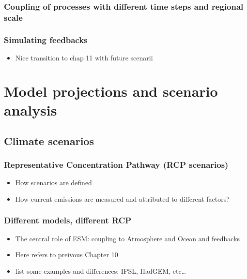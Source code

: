 \documentclass[oneside]{book}
\providecommand{\tightlist}{%
  \setlength{\itemsep}{0pt}\setlength{\parskip}{0pt}}
\begin{document}
\subsection{Coupling of processes with different time steps and regional
scale}\label{coupling-of-processes-with-different-time-steps-and-regional-scale}

\subsection{Simulating feedbacks}\label{simulating-feedbacks}

\begin{itemize}
\tightlist
\item
  Nice transition to chap 11 with future scenarii
\end{itemize}

\chapter{Model projections and scenario
analysis}\label{model-projections-and-scenario-analysis}


\section{Climate scenarios}\label{climate-scenarios}

\subsection{Representative Concentration Pathway (RCP
scenarios)}\label{representative-concentration-pathway-rcp-scenarios}

\begin{itemize}
\tightlist
\item
  How scenarios are defined
\item
  How current emissions are measured and attributed to different
  factors?
\end{itemize}

\subsection{Different models, different
RCP}\label{different-models-different-rcp}

\begin{itemize}
\tightlist
\item
  The central role of ESM: coupling to Atmosphere and Ocean and
  feedbacks
\item
  Here refers to preivous Chapter 10
\item
  list some examples and differences: IPSL, HadGEM, etc\ldots{}
\end{itemize}
\end{document}
